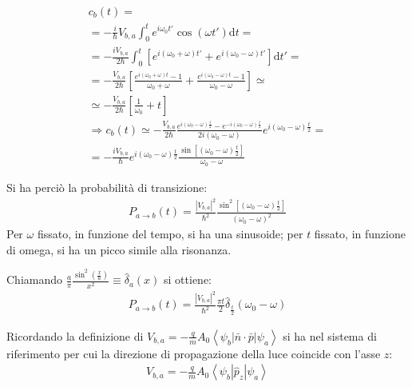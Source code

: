 \begin{equation}\begin{split}
c_b\left(t\right)=\\
=-\frac{i}{\hbar }V_{b,a}\int_0^t{e^{i\omega _0t'}\cos{\left(\omega t'\right)}\textrm{d}t}=\\
=-\frac{iV_{b,a}}{2\hbar }\int_0^t{\left[e^{i\left(\omega _0+\omega \right)t'}+e^{i\left(\omega _0-\omega \right)t'}\right]\textrm{d}t'}=\\
=-\frac{V_{b,a}}{2\hbar }\left[\frac{e^{i\left(\omega _0+\omega \right)t}-1}{\omega _0+\omega }+\frac{e^{i\left(\omega _0-\omega \right)t}-1}{\omega _0-\omega }\right]\simeq \\
\simeq -\frac{V_{b,a}}{2\hbar }\left[\frac{1}{\omega _0}+t\right]\\
\Longrightarrow c_b\left(t\right)\simeq-\frac{V_{b,a}}{2\hbar }\frac{e^{i\left(\omega _0-\omega \right)\frac{t}{2}}-e^{-i\left(\omega _0-\omega \right)\frac{t}{2}}}{2i\left(\omega _0-\omega \right)}e^{i\left(\omega _0-\omega \right)\frac{t}{2}}=\\
=-\frac{iV_{b,a}}{\hbar }e^{i\left(\omega _0-\omega \right)\frac{t}{2}}\frac{\sin{\left[\left(\omega _0-\omega \right)\frac{t}{2}\right]}}{\omega _0-\omega }
\end{split}\end{equation}

Si ha perciò la probabilità di transizione:
\begin{equation}\begin{split}
P_{a\to b}\left(t\right)=\frac{|V_{b,a}|^2}{\hbar ^2}\frac{\sin^2{\left[\left(\omega _0-\omega \right)\frac{t}{2}\right]}}{\left(\omega _0-\omega \right)^2}
\end{split}\end{equation}
Per $\omega $ fissato, in funzione del tempo, si ha una sinusoide; per $t$ fissato, in funzione di omega, si ha un picco simile alla risonanza.

Chiamando $\frac{a}{\pi}\frac{\sin^2{\left(\frac{x}{a}\right)}}{x^2}\equiv \hat \delta_a\left(x\right)$ si ottiene:
\begin{equation}\begin{split}
P_{a\to b}\left(t\right)=\frac{|V_{b,a}|^2}{\hbar ^2}\frac{\pi t}{2}\hat \delta_{\frac{t}{2}}\left(\omega _0-\omega \right)
\end{split}\end{equation}

Ricordando la definizione di $V_{b,a}=-\frac{q}{m}A_0\left\langle \psi _b|\bar n\cdot \bar p|\psi _a \right\rangle$ si ha nel sistema di riferimento per cui la direzione di propagazione della luce coincide con l'asse $z$:
\begin{equation}\begin{split}
V_{b,a}=-\frac{q}{m}A_0\left\langle \psi _b|\hat p_z|\psi _a \right\rangle
\end{split}\end{equation}


